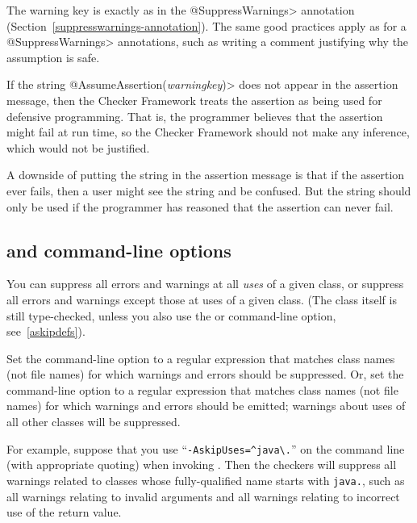 The warning key is exactly as in the \<@SuppressWarnings> annotation
(Section~\ref{suppresswarnings-annotation}).  The same good practices apply
as for a \<@SuppressWarnings> annotations, such as writing a comment
justifying why the assumption is safe.

If the string \<@AssumeAssertion(\emph{warningkey})> does not appear in the
assertion message, then the Checker Framework treats the assertion as
being used for defensive programming.  That is, the programmer believes
that the assertion might fail at run time, so the Checker Framework should
not make any inference, which would not be justified.

A downside of putting the string in the assertion message is that if the
assertion ever fails, then a user might see the string and be confused.
But the string should only be used if the programmer has reasoned that the
assertion can never fail.



\subsection{ and  command-line options\label{askipuses}}

You can suppress all errors and warnings at all \emph{uses} of a given
class, or suppress all errors and warnings except those at uses of a given
class.  (The class itself is still type-checked, unless you also use
the  or  command-line option, see~\ref{askipdefs}).

Set the  command-line option to a
regular expression that matches class names (not file names) for which warnings and errors
should be suppressed.
Or, set the  command-line option to a
regular expression that matches class names (not file names) for which warnings and errors
should be emitted; warnings about uses of all other classes will be suppressed.

For example, suppose that you use
``{\codesize\verb|-AskipUses=^java\.|}'' on the command line
(with appropriate quoting) when invoking
.  Then the checkers will suppress all warnings related to
classes whose fully-qualified name starts with \codesize\verb|java.|, such
as all warnings relating to invalid arguments and all warnings relating to
incorrect use of the return value.

